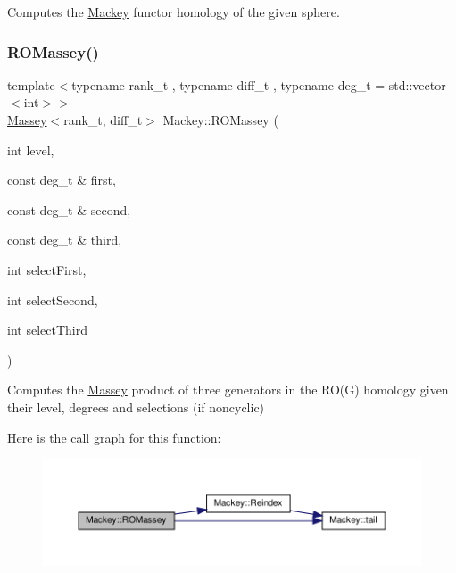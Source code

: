Computes the \hyperlink{namespaceMackey}{Mackey} functor homology of the given sphere. 

\mbox{\label{namespaceMackey_ab75d7bcfa2d92d01bea0d5eef9f48398}} 
\subsubsection{\texorpdfstring{R\+O\+Massey()}{ROMassey()}\hspace{0.1cm}{\footnotesize\ttfamily [1/2]}}
{\footnotesize\ttfamily template$<$typename rank\+\_\+t , typename diff\+\_\+t , typename deg\+\_\+t  = std\+::vector$<$int$>$$>$ \\
\hyperlink{classMackey_1_1Massey}{Massey}$<$rank\+\_\+t, diff\+\_\+t$>$ Mackey\+::\+R\+O\+Massey (\begin{DoxyParamCaption}\item[{int}]{level,  }\item[{const deg\+\_\+t \&}]{first,  }\item[{const deg\+\_\+t \&}]{second,  }\item[{const deg\+\_\+t \&}]{third,  }\item[{int}]{select\+First,  }\item[{int}]{select\+Second,  }\item[{int}]{select\+Third }\end{DoxyParamCaption})}



Computes the \hyperlink{classMackey_1_1Massey}{Massey} product of three generators in the R\+O(\+G) homology given their level, degrees and selections (if noncyclic) 

Here is the call graph for this function\+:\nopagebreak
\begin{figure}[H]
\begin{center}
\leavevmode
\includegraphics[width=350pt]{namespaceMackey_ab75d7bcfa2d92d01bea0d5eef9f48398_cgraph}
\end{center}
\end{figure}
\mbox{\label{namespaceMackey_a7301f53f372c1dc670b4c10f878137a2}} 
